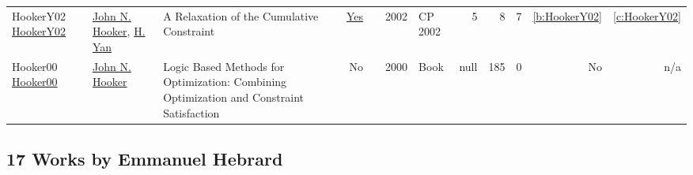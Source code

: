 {\begin{longtable}{>{\raggedright\arraybackslash}p{3cm}>{\raggedright\arraybackslash}p{6cm}>{\raggedright\arraybackslash}p{6.5cm}rrrp{2.5cm}rrrrr}
HookerY02 \href{https://doi.org/10.1007/3-540-46135-3\_46}{HookerY02} & \hyperref[auth:a162]{John N. Hooker}, \hyperref[auth:a294]{H. Yan} & A Relaxation of the Cumulative Constraint & \href{../works/HookerY02.pdf}{Yes} & \cite{HookerY02} & 2002 & CP 2002 & 5 & 8 & 7 & \ref{b:HookerY02} & \ref{c:HookerY02}\\
Hooker00 \href{http://dx.doi.org/10.1002/9781118033036}{Hooker00} & \hyperref[auth:a162]{John N. Hooker} & Logic Based Methods for Optimization: Combining Optimization and Constraint Satisfaction & No & \cite{Hooker00} & 2000 & Book & null & 185 & 0 & No & n/a\\
\end{longtable}
}

\clearpage
\subsection{17 Works by Emmanuel Hebrard}
\label{sec:a1}

